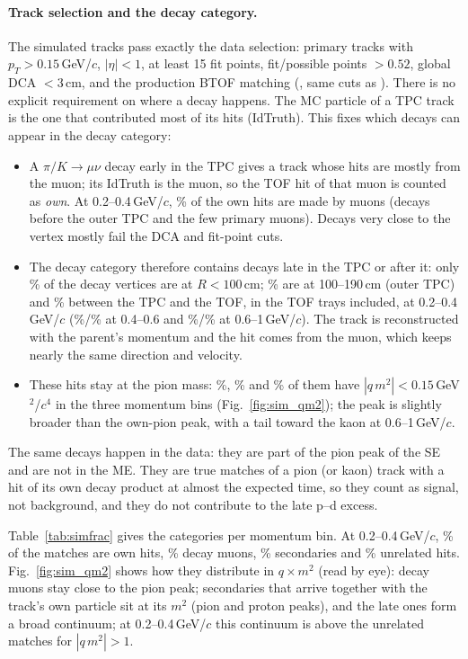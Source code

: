 \paragraph{Track selection and the decay category.} The simulated tracks pass exactly the data selection: primary tracks with
$p_T>0.15$\,GeV/$c$, $|\eta|<1$, at least 15 fit points, fit/possible points $>0.52$, global DCA $<3$\,cm, and the production BTOF matching
(, same cuts as ). There is no explicit requirement on where a decay happens. The MC
particle of a TPC track is the one that contributed most of its hits (IdTruth). This fixes which decays can appear in the decay category:
\begin{itemize}
\item A $\pi/K\to\mu\nu$ decay early in the TPC gives a track whose hits are mostly from the muon; its IdTruth is the muon, so the TOF hit
  of that muon is counted as \emph{own}. At 0.2--0.4\,GeV/$c$, \ownMuA\% of the own hits are made by muons (decays before the outer TPC
  and the few primary muons). Decays very close to the vertex mostly fail the DCA and fit-point cuts.
\item The decay category therefore contains decays late in the TPC or after it: only \decRALo\% of the decay vertices are at $R<100$\,cm;
  \decRATpc\% are at 100--190\,cm (outer TPC) and \decRAOut\% between the TPC and the TOF, in the TOF trays included, at 0.2--0.4\,GeV/$c$
  (\decRBTpc\%/\decRBOut\% at 0.4--0.6 and \decRCTpc\%/\decRCOut\% at 0.6--1\,GeV/$c$). The track is reconstructed with the parent's
  momentum and the hit comes from the muon, which keeps nearly the same direction and velocity.
\item These hits stay at the pion mass: \decPiA\%, \decPiB\% and \decPiC\% of them have $|q\,m^2|<0.15$\,GeV$^2$/$c^4$ in the three
  momentum bins (Fig.~\ref{fig:sim_qm2}); the peak is slightly broader than the own-pion peak, with a tail toward the kaon at 0.6--1\,GeV/$c$.
\end{itemize}
The same decays happen in the data: they are part of the pion peak of the SE and are not in the ME. They are true matches of a
pion (or kaon) track with a hit of its own decay product at almost the expected time, so they count as signal, not background, and they do
not contribute to the late p--d excess.

Table~\ref{tab:simfrac} gives the categories per momentum bin. At 0.2--0.4\,GeV/$c$, \simFrOwnA\% of the matches are own hits,
\simFrDecA\% decay muons, \simFrSecA\% secondaries and \simFrUnrA\% unrelated hits.
Fig.~\ref{fig:sim_qm2} shows how they distribute in $q\times m^2$ (read by eye): decay muons stay close to the pion peak; secondaries
that arrive together with the track's own particle sit at its $m^2$ (pion and proton peaks), and the late ones form a broad
continuum; at 0.2--0.4\,GeV/$c$ this continuum is above the unrelated matches for $|q\,m^2|>1$.

